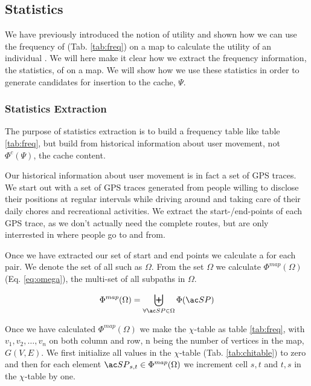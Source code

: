 



\subsection{Statistics}

We have previously introduced the notion of utility and shown how we can use the frequency of \spaths (Tab. \ref{tab:freq}) on a map to calculate the utility of an individual \spathns. We will here make it clear how we extract the frequency information, the statistics, of \spaths on a map. We will show how we use these statistics in order to generate \spath candidates for insertion to the cache, $\Psi$.

\subsubsection{Statistics Extraction}\label{sec:statextract}


The purpose of statistics extraction is to build a frequency table like table \ref{tab:freq}, but build from historical information about user movement, not $\Phi^c(\Psi)$, the cache content.

Our historical information about user movement is in fact a set of GPS traces. We start out with a set of GPS traces generated from people willing to disclose their positions at regular intervals while driving around and taking care of their daily chores and recreational activities. 
We extract the start-/end-points of each GPS trace, as we don't actually need the complete routes, but are only interrested in where people go to and from. 

Once we have extracted our set of start and end points we calculate a \spath for each pair. We denote the set of all such \spath as $\Omega$. From the set $\Omega$ we calculate $\Phi^{map}(\Omega)$ (Eq. \ref{eq:omega}), the multi-set of all subpaths in $\Omega$.

\begin{equation} \label{eq:omega}
 \Phi^{map}(\Omega) = \biguplus\limits_{\forall \spath \in \Omega} \Phi(\spath)
\end{equation}

Once we have calculated $\Phi^{map}(\Omega)$ we make the $\chi$-table as table \ref{tab:freq}, with $v_1,v_2,\ldots,v_n$ on both column and row, n being the number of vertices in the map, $G(V,E)$. We first initialize all values in the $\chi$-table (Tab. \ref{tab:chitable}) to zero and then for each element $\spath_{s,t} \in \Phi^{map}(\Omega)$ we increment cell $s,t$ and $t,s$ in the $\chi$-table by one.

